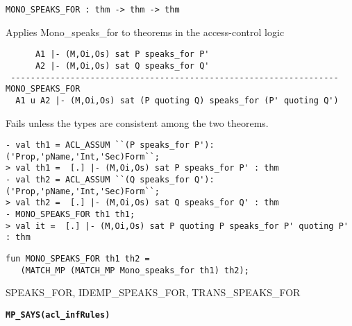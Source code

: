 \begin{verbatim}
MONO_SPEAKS_FOR : thm -> thm -> thm
\end{verbatim}

\SYNOPSIS
Applies Mono_speaks_for to theorems in the access-control logic

\DESCRIBE

\begin{scriptsize}
\begin{verbatim}
      A1 |- (M,Oi,Os) sat P speaks_for P'
      A2 |- (M,Oi,Os) sat Q speaks_for Q'
 ------------------------------------------------------------------ MONO_SPEAKS_FOR
  A1 u A2 |- (M,Oi,Os) sat (P quoting Q) speaks_for (P' quoting Q')
\end{verbatim}
\end{scriptsize}


\FAILURE 
Fails unless the types are consistent among the two theorems.

\EXAMPLE
\begin{holboxed}
  \begin{scriptsize}
\begin{verbatim}
- val th1 = ACL_ASSUM ``(P speaks_for P'):('Prop,'pName,'Int,'Sec)Form``;
> val th1 =  [.] |- (M,Oi,Os) sat P speaks_for P' : thm
- val th2 = ACL_ASSUM ``(Q speaks_for Q'):('Prop,'pName,'Int,'Sec)Form``;
> val th2 =  [.] |- (M,Oi,Os) sat Q speaks_for Q' : thm
- MONO_SPEAKS_FOR th1 th1;
> val it =  [.] |- (M,Oi,Os) sat P quoting P speaks_for P' quoting P' : thm
\end{verbatim}
  \end{scriptsize}

\end{holboxed}

\IMPLEMENTATION
\begin{holboxed}
\begin{verbatim}
fun MONO_SPEAKS_FOR th1 th2 =
   (MATCH_MP (MATCH_MP Mono_speaks_for th1) th2);
\end{verbatim}
\end{holboxed}

\SEEALSO
SPEAKS\_FOR, IDEMP\_SPEAKS\_FOR, TRANS\_SPEAKS\_FOR
\ENDDOC



\begin{holboxed}
  \begin{Large}
    \textbf{\texttt{MP\_SAYS}}\hfill{}\textbf{\texttt{(acl\_infRules)}}
  \end{Large}
\end{holboxed}

